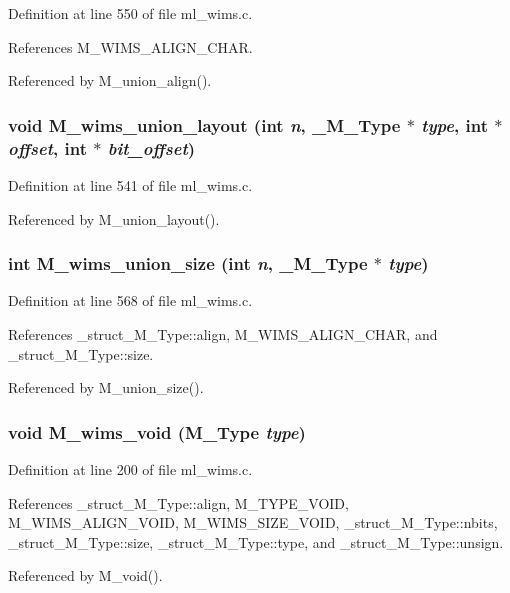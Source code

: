 Definition at line 550 of file ml\_\-wims.c.

References M\_\-WIMS\_\-ALIGN\_\-CHAR.

Referenced by M\_\-union\_\-align().
\subsubsection{\setlength{\rightskip}{0pt plus 5cm}void M\_\-wims\_\-union\_\-layout (int {\em n}, \bf{\_\-M\_\-Type} $\ast$ {\em type}, int $\ast$ {\em offset}, int $\ast$ {\em bit\_\-offset})}\label{m__wims_8h_67eff361295f7bf737e710c3cd2d421f}




Definition at line 541 of file ml\_\-wims.c.

Referenced by M\_\-union\_\-layout().
\subsubsection{\setlength{\rightskip}{0pt plus 5cm}int M\_\-wims\_\-union\_\-size (int {\em n}, \bf{\_\-M\_\-Type} $\ast$ {\em type})}\label{m__wims_8h_bda748cea405973937a4d5eaa170fddd}




Definition at line 568 of file ml\_\-wims.c.

References \_\-struct\_\-M\_\-Type::align, M\_\-WIMS\_\-ALIGN\_\-CHAR, and \_\-struct\_\-M\_\-Type::size.

Referenced by M\_\-union\_\-size().
\subsubsection{\setlength{\rightskip}{0pt plus 5cm}void M\_\-wims\_\-void (\bf{M\_\-Type} {\em type})}\label{m__wims_8h_80f549af8edd654d729ec810b32913b6}




Definition at line 200 of file ml\_\-wims.c.

References \_\-struct\_\-M\_\-Type::align, M\_\-TYPE\_\-VOID, M\_\-WIMS\_\-ALIGN\_\-VOID, M\_\-WIMS\_\-SIZE\_\-VOID, \_\-struct\_\-M\_\-Type::nbits, \_\-struct\_\-M\_\-Type::size, \_\-struct\_\-M\_\-Type::type, and \_\-struct\_\-M\_\-Type::unsign.

Referenced by M\_\-void().